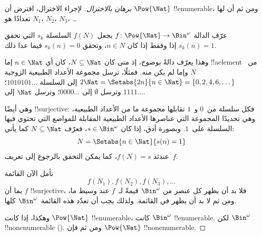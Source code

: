\documentclass[../../../include/open-logic-section]{subfiles}
\begin{document}
\begin{proof}[برهان {} بالاختزال]
لإجراء الاختزال، افترض أن $\Pow{\Nat}$ !!{enumerable}، ومن ثم أن لها
تعدادًا هو $N_{1}$، $N_{2}$، $N_{3}$، \dots

عرّف الدالة $f \colon \Pow{\Nat} \to \Bin^\omega$ بجعل
$f(N)$ السلسلة $s_{k}$ التي تحقق $s_{k}(n) = 1$ إذا وفقط إذا كان $n \in N$،
وتحقق $s_k(n) = 0$ فيما عدا ذلك.

وهذا يعرّف دالةً بوضوح، إذ متى كان $N \subseteq \Nat$، كان
أي $n \in \Nat$ إما !!a{element} من~$N$ وإما لم يكن منه. فمثلًا،
ترسل مجموعة الأعداد الطبيعية الزوجية $2\Nat = \Setabs{2n}{n \in \Nat} = \{0,2, 4, 6,
\dots\}$ إلى السلسلة $1010101\dots$؛ وترسل $\emptyset$ إلى
$0000\dots$؛ وترسل $\Nat$ إلى $1111\dots$.

وهي أيضًا !!{surjective}: فكل سلسلة من~$0$ و~$1$ تقابلها مجموعة ما
من الأعداد الطبيعية، وهي تحديدًا المجموعة التي عناصرها الأعداد الطبيعية
المقابلة للمواضع التي تحتوي فيها السلسلة على~$1$. وبصورة أدق، إذا كان $s \in \Bin^\omega$، فعرّف $N
\subseteq \Nat$ كما يأتي:
\[
N = \Setabs{n \in \Nat}{s(n) = 1}
\]
عندئذ $f(N) = s$، كما يمكن التحقق بالرجوع إلى تعريف~$f$.

تأمل الآن القائمة
\[
f(N_1), f(N_2), f(N_3), \dots
\]
بما أن $f$ !!{surjective}، فلا بد أن يظهر كل عنصر من $\Bin^\omega$
قيمةً لـ~$f$ عند وسيط ما، ومن ثم لا بد أن يظهر في القائمة. ولذلك
يجب أن تعدّد هذه القائمة~$\Bin^\omega$ كلها.

وهكذا، إذا كانت $\Pow{\Nat}$ !!{enumerable}، كانت $\Bin^\omega$
!!{enumerable}. لكن $\Bin^\omega$ !!{nonenumerable}
(). ومن ثم فإن $\Pow{\Nat}$
!!{nonenumerable}.
\end{proof}

\end{document}

